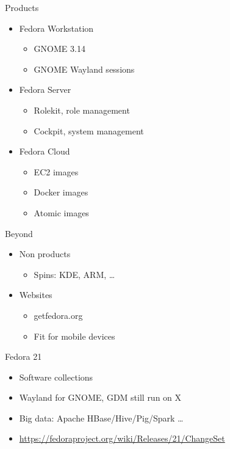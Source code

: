 \begin{frame}{Products}
  \begin{itemize}
    \item Fedora Workstation
      \begin{itemize}
        \item GNOME 3.14
        \item GNOME Wayland sessions
      \end{itemize}
    \item Fedora Server
      \begin{itemize}
        \item Rolekit, role management
        \item Cockpit, system management
      \end{itemize}
    \item Fedora Cloud
      \begin{itemize}
        \item EC2 images
        \item Docker images
        \item Atomic images
      \end{itemize}
  \end{itemize}
\end{frame}

\begin{frame}{Beyond}
  \begin{itemize}
    \item Non products
      \begin{itemize}
        \item Spins: KDE, ARM, \ldots
      \end{itemize}
    \item Websites
      \begin{itemize}
        \item getfedora.org
        \item Fit for mobile devices
      \end{itemize}
  \end{itemize}
\end{frame}

\begin{frame}{Fedora 21}
  \begin{itemize}
    \item Software collections
    \item Wayland for GNOME, GDM still run on X
    \item Big data: Apache HBase/Hive/Pig/Spark \ldots
    \item \url{https://fedoraproject.org/wiki/Releases/21/ChangeSet}
  \end{itemize}
\end{frame}
